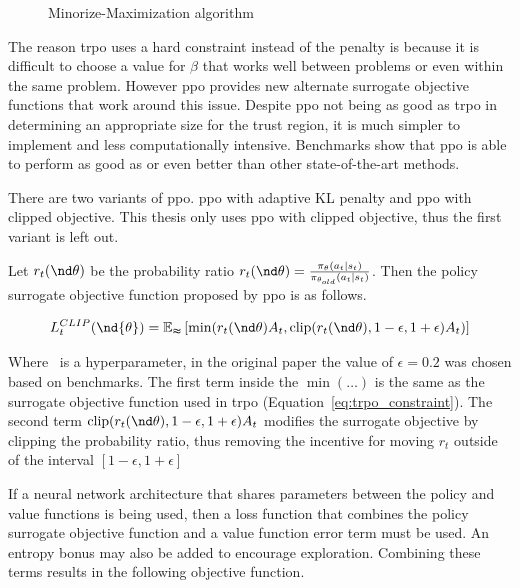 \begin{figure}[h!]			
	\centering
				
	\caption{Minorize-Maximization algorithm}
	\label{fig:mma}
\end{figure}

The reason \acrshort{trpo} uses a hard constraint instead of the penalty is because it is difficult to choose a value for $\beta$ that works well between problems or even within the same problem. However \acrshort{ppo} provides new alternate surrogate objective functions that work around this issue. Despite \acrshort{ppo} not being as good as \acrshort{trpo} in determining an appropriate size for the trust region, it is much simpler to implement and less computationally intensive. Benchmarks show that \acrshort{ppo} is able to perform as good as or even better than other state-of-the-art methods\cite{schulman2017proximal}. 

There are two variants of \acrshort{ppo}. \acrshort{ppo} with adaptive KL penalty and \acrshort{ppo} with clipped objective. This thesis only uses \acrshort{ppo} with clipped objective, thus the first variant is left out.

Let $r_t(\nd\theta)$ be the probability ratio $r_t(\nd\theta)=\frac{\pi_\theta(a_t | s_t)}{\pi_{\theta_{old}}(a_t | s_t)}$. Then the policy surrogate objective function proposed by \acrshort{ppo} is as follows.

\begin{equation}
  L_t^{CLIP}(\nd{\theta}) = \mathbb{E_t} \left[\min(
    r_t(\nd\theta)A_t,
    \text{clip}(r_t(\nd\theta), 1-\epsilon, 1+\epsilon)A_t
  )\right]
\end{equation}

Where \eps\ is a hyperparameter, in the original paper the value of $\epsilon=0.2$ was chosen based on benchmarks\cite{schulman2017proximal}. The first term inside the $\min(\dots)$ is the same as the surrogate objective function used in \acrshort{trpo} (Equation~\ref{eq:trpo_constraint}). The second term $\text{clip}(r_t(\nd\theta), 1-\epsilon, 1+\epsilon)A_t$ modifies the surrogate objective by clipping the probability ratio, thus removing the incentive for moving $r_t$ outside of the interval $\left[1-\epsilon, 1+\epsilon\right]$

If a neural network architecture that shares parameters between the policy and value functions is being used, then a loss function that combines the policy surrogate objective function and a value function error term must be used. An entropy bonus may also be added to encourage exploration. Combining these terms results in the following objective function\cite{schulman2017proximal}.


